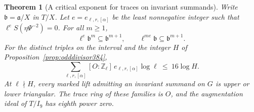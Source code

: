 \documentclass[a4paper,11pt]{article}
\newtheorem{theorem}[proposition]{Theorem}
\theoremstyle{definition}
\theoremstyle{remark}
\newcommand{\ZZ}{\mathbb Z}\newcommand{\ord}{\operatorname{ord}}
\numberwithin{equation}{section}
\begin{document}
\begin{theorem}[A critical exponent for traces on invariant summands]
\label{thm:flagvaluation385}
Write \(\mathfrak b=\mathfrak a/X\) in \(T/X\). Let
\(e=e_{\ell,r,[\alpha]}\) be the least nonnegative integer such
that \(\ell^e S(\eta\Psi^{-2})=0\). For all \(m\ge1\),
\[
 \ell^e\mathfrak b^m\subseteq\mathfrak b^{m+1},\qquad
 \ell^{me}\mathfrak b\subseteq\mathfrak b^{m+1}.
\]
For the distinct triples on the interval and the integer \(H\)
of Proposition~\ref{prop:odddivisor384},
\[
 \sum_{\ell,r,[\alpha]} [O:\ZZ_\ell]\,
                e_{\ell,r,[\alpha]}\log\ell\ \le\ 16\log H .
\]
At \(\ell\nmid H\), every marked lift admitting an invariant
summand on \(G\) is upper or lower triangular. The trace ring
of these families is \(O\), and the augmentation ideal of
\(T/I_9\) has eighth power zero.
\end{theorem}
\end{document}
